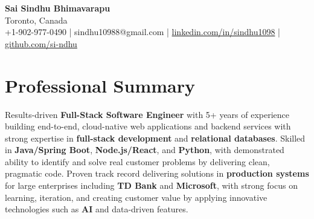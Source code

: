 \documentclass[letterpaper,11pt]{article}
\begin{document}
\begin{center}
  {\Large \textbf{Sai Sindhu Bhimavarapu}} \\
  Toronto, Canada \\
  +1-902-977-0490 \enspace | \enspace sindhu10988@gmail.com \enspace | \enspace \href{https://www.linkedin.com/in/sindhu1098/}{linkedin.com/in/sindhu1098} \enspace | \enspace \href{https://github.com/si-ndhu}{github.com/si-ndhu}
\end{center}

\section{Professional Summary}
  \begin{itemize}[leftmargin=0.15in, label={}]
    \small{\item{
     Results-driven \textbf{Full-Stack Software Engineer} with 5+ years of experience building end-to-end, cloud-native web applications and backend services with strong expertise in \textbf{full-stack development} and \textbf{relational databases}. Skilled in \textbf{Java/Spring Boot}, \textbf{Node.js/React}, and \textbf{Python}, with demonstrated ability to identify and solve real customer problems by delivering clean, pragmatic code. Proven track record delivering solutions in \textbf{production systems} for large enterprises including \textbf{TD Bank} and \textbf{Microsoft}, with strong focus on learning, iteration, and creating customer value by applying innovative technologies such as \textbf{AI} and data-driven features.
    }}
  \end{itemize}
\vspace{-16pt}

\end{document}
